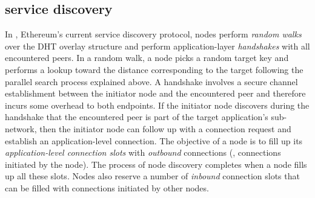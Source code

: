 





\subsection{\discv service discovery}
\label{sec:background:discv4}

In \discv, Ethereum's current service discovery protocol, nodes perform \textit{random walks} over the DHT overlay structure and perform application-layer \emph{handshakes} with all encountered peers.
In a random walk, a node picks a random target key and performs a lookup toward the distance corresponding to the target following the parallel search process explained above.  
A handshake involves a secure channel establishment between the initiator node and the encountered peer and therefore incurs some overhead to both endpoints.
If the initiator node discovers during the handshake that the encountered peer is part of the target application's sub-network, then the initiator node can follow up with a connection request and establish an application-level connection.
The objective of a node is to fill up its \textit{application-level connection slots} with \emph{outbound}  connections (\ie, connections initiated by the node).
The process of node discovery completes when a node fills up all these slots.
Nodes also reserve a number of \emph{inbound} connection slots that can be filled with connections initiated by other nodes. 

